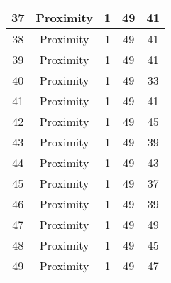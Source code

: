 \documentclass[results.tex]{subfiles}
\begin{document}
\begin{center}
\begin{tabular}{| c || c | c | c | c |}
            \hline
            37                      & Proximity                    & 1                      & 49                      & 41                   \\
            \hline
            38                      & Proximity                    & 1                      & 49                      & 41                   \\
            \hline
            39                      & Proximity                    & 1                      & 49                      & 41                   \\
            \hline
            40                      & Proximity                    & 1                      & 49                      & 33                   \\
            \hline
            41                      & Proximity                    & 1                      & 49                      & 41                   \\
            \hline
            42                      & Proximity                    & 1                      & 49                      & 45                   \\
            \hline
            43                      & Proximity                    & 1                      & 49                      & 39                   \\
            \hline
            44                      & Proximity                    & 1                      & 49                      & 43                   \\
            \hline
            45                      & Proximity                    & 1                      & 49                      & 37                   \\
            \hline
            46                      & Proximity                    & 1                      & 49                      & 39                   \\
            \hline
            47                      & Proximity                    & 1                      & 49                      & 49                   \\
            \hline
            48                      & Proximity                    & 1                      & 49                      & 45                   \\
            \hline
            49                      & Proximity                    & 1                      & 49                      & 47                   \\
            \hline
        \end{tabular}
    \end{center}
\end{document}
